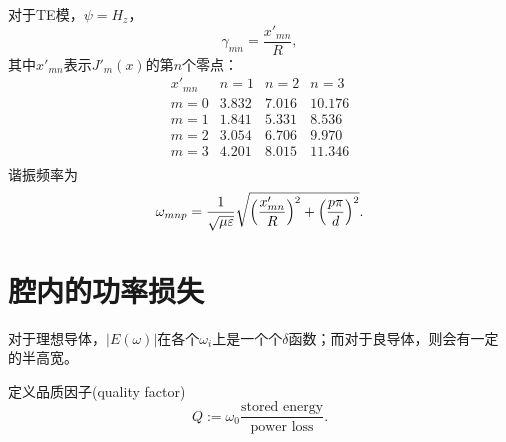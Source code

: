 对于TE模，$\psi=H_z$，
\[
    \gamma_{mn}=\frac{x'_{mn}}R,
\]
其中$x'_{mn}$表示$J'_m(x)$的第$n$个零点：
\begin{equation}
    \begin{matrix}
        x'_{mn}&n=1&n=2&n=3\\
        m=0&3.832&7.016&10.176\\
        m=1&1.841&5.331& 8.536\\
        m=2&3.054&6.706& 9.970\\
        m=3&4.201&8.015&11.346\\
    \end{matrix}
\end{equation}
谐振频率为
\begin{equation}
    \omega_{mnp}=\frac1{\sqrt{\mu\varepsilon}}\sqrt{\Bigl(\frac{x'_{mn}}R\Bigr)^2+\Bigl(\frac{p\pi}d\Bigr)^2}.
\end{equation}
\section{腔内的功率损失}
对于理想导体，$|E(\omega)|$在各个$\omega_i$上是一个个$\delta$函数；而对于良导体，则会有一定的半高宽。

定义品质因子(quality factor)
\begin{equation}
    Q:=\omega_0\frac{\text{stored energy}}{\text{power loss}}.
\end{equation}

